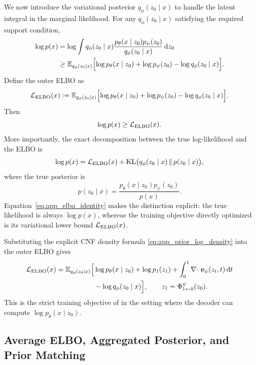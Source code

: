 We now introduce the variational posterior $q_{\phi}(z_0\mid x)$ to handle the latent integral in the marginal likelihood. For any $q_{\phi}(z_0\mid x)$ satisfying the required support condition,
\begin{align}
\log p(x)
&=
\log \int q_{\phi}(z_0\mid x)
\frac{p_{\theta}(x\mid z_0)p_{\psi}(z_0)}{q_{\phi}(z_0\mid x)}\,\mathrm{d} z_0 \\
&\ge
\mathbb{E}_{q_{\phi}(z_0\mid x)}\Bigl[
\log p_{\theta}(x\mid z_0)
+\log p_{\psi}(z_0)
-\log q_{\phi}(z_0\mid x)
\Bigr].
\label{eq:app_outer_elbo}
\end{align}
Define the outer ELBO as
\begin{equation}
\mathcal{L}_{\mathrm{ELBO}}(x)
:=
\mathbb{E}_{q_{\phi}(z_0\mid x)}\Bigl[
\log p_{\theta}(x\mid z_0)
+\log p_{\psi}(z_0)
-\log q_{\phi}(z_0\mid x)
\Bigr].
\label{eq:app_elbo_def}
\end{equation}
Then
\begin{equation}
\log p(x)\ge \mathcal{L}_{\mathrm{ELBO}}(x).
\label{eq:app_elbo_lower_bound}
\end{equation}
More importantly, the exact decomposition between the true log-likelihood and the ELBO is
\begin{equation}
\log p(x)
=
\mathcal{L}_{\mathrm{ELBO}}(x)
+
\mathrm{KL}\bigl(q_{\phi}(z_0\mid x)\,\|\,p(z_0\mid x)\bigr),
\label{eq:app_elbo_identity}
\end{equation}
where the true posterior is
\begin{equation}
p(z_0\mid x)=\frac{p_{\theta}(x\mid z_0)p_{\psi}(z_0)}{p(x)}.
\label{eq:app_true_posterior}
\end{equation}
Equation~\eqref{eq:app_elbo_identity} makes the distinction explicit: the true likelihood is always $\log p(x)$, whereas the training objective directly optimized is its variational lower bound $\mathcal{L}_{\mathrm{ELBO}}(x)$.

Substituting the explicit CNF density formula \eqref{eq:app_prior_log_density} into the outer ELBO gives
\begin{align}
\mathcal{L}_{\mathrm{ELBO}}(x)
=
\mathbb{E}_{q_{\phi}(z_0\mid x)}\Bigl[
&\log p_{\theta}(x\mid z_0)
+\log p_1(z_1)
+\int_0^1 \nabla\!\cdot \bm{v}_{\psi}(z_t,t)\,\mathrm{d} t \\
&-\log q_{\phi}(z_0\mid x)
\Bigr],
\qquad z_1=\Phi^{\psi}_{1\leftarrow 0}(z_0).
\label{eq:app_elbo_with_cnf_prior}
\end{align}
This is the strict training objective of \method in the setting where the decoder can compute $\log p_{\theta}(x\mid z_0)$.

\subsection{Average ELBO, Aggregated Posterior, and Prior Matching}
\label{app:avg_elbo}

